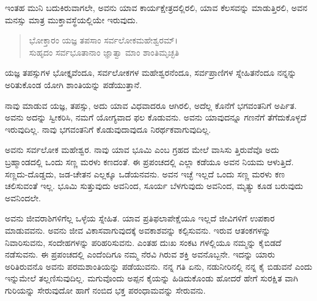 ಇಂತಹ ಮುನಿ ಬದುಕಿರುವಾಗಲೇ, ಅವನು ಯಾವ ಕಾರ್ಯಕ್ಷೇತ್ರದಲ್ಲಿರಲಿ, ಯಾವ ಕೆಲಸವನ್ನು ಮಾಡುತ್ತಿರಲಿ, ಅವನ ಮನಸ್ಸು ಮಾತ್ರ ಮುಕ್ತಾವಸ್ಥೆಯಲ್ಲಿಯೇ ಇರುವುದು.

\begin{verse}
ಭೋಕ್ತಾರಂ ಯಜ್ಞ ತಪಸಾಂ ಸರ್ವಲೋಕಮಹೇಶ್ವರಮ್​।\\ಸುಹೃದಂ ಸರ್ವಭೂತಾನಾಂ ಜ್ಞಾತ್ವಾ ಮಾಂ ಶಾಂತಿಮೃಚ್ಛತಿ 
\end{verse}

{\small ಯಜ್ಞ ತಪಸ್ಸುಗಳ ಭೋಕ್ತೃವೆಂದೂ, ಸರ್ವಲೋಕಗಳ ಮಹೇಶ್ವರನೆಂದೂ, ಸರ್ವಪ್ರಾಣಿಗಳ ಸ್ನೇಹಿತನೆಂದೂ ನನ್ನನ್ನು ಅರಿತುಕೊಂಡ ಯೋಗಿ ಶಾಂತಿಯನ್ನು ಪಡೆಯುತ್ತಾನೆ.}

ನಾವು ಮಾಡುವ ಯಜ್ಞ, ತಪಸ್ಸು, ಅದು ಯಾವ ವಿಧವಾದರೂ ಆಗಿರಲಿ, ಅದೆಲ್ಲ ಕೊನೆಗೆ ಭಗವಂತನಿಗೆ ಅರ್ಪಿತ. ಅವನು ಅದನ್ನು ಸ್ವೀಕರಿಸಿ, ನಮಗೆ ಯೋಗ್ಯವಾದ ಫಲ ಕೊಡುವನು. ಅವನು ಯಾವುದನ್ನೂ ಗಣನೆಗೆ ತೆಗೆದುಕೊಳ್ಳದೆ ಇರುವುದಿಲ್ಲ. ನಾವು ಭಗವಂತನಿಗೆ ಕೊಡುವುದಾವುದೂ ನಿರರ್ಥಕವಾಗುವುದಿಲ್ಲ. 

ಅವನು ಸರ್ವಲೋಕ ಮಹೇಶ್ವರ. ನಾವು ಯಾವ ಭೂಮಿ ಎಂಬ ಗ್ರಹದ ಮೇಲೆ ವಾಸಿಸು ತ್ತಿರುವೆವೊ ಅದು ಬ್ರಹ್ಮಾಂಡದಲ್ಲಿ ಒಂದು ಸಣ್ಣ ಮರಳು ಕಣದಂತೆ. ಈ ಪ್ರಪಂಚದಲ್ಲಿ ಎಲ್ಲಾ ಕಡೆಯೂ ಅವನ ನಿಯಮ ಆಳುತ್ತಿದೆ. ಸಣ್ಣದು-ದೊಡ್ಡದು, ಜಡ-ಚೇತನ ಎಲ್ಲಕ್ಕೂ ಒಡೆಯನವನು. ಅವನ ಇಚ್ಛೆ ಇಲ್ಲದೆ ಒಂದು ಸಣ್ಣ ಮರಳು ಕಣ ಚಲಿಸುವಂತೆ ಇಲ್ಲ. ಭೂಮಿ ಸುತ್ತುವುದು ಅವನಿಂದ, ಸೂರ್ಯ ಬೆಳಗುವುದು ಅವನಿಂದ, ಮೃತ್ಯು ಕೂಡ ಬರುವುದು ಅವನಿಂದಲೇ.

ಅವನು ಜೀವರಾಶಿಗಳಿಗೆಲ್ಲ ಒಳ್ಳೆಯ ಸ್ನೇಹಿತ. ಯಾವ ಪ್ರತಿಫಲಾಪೇಕ್ಷೆಯೂ ಇಲ್ಲದೆ ಜೀವಿಗಳಿಗೆ ಉಪಕಾರ ಮಾಡುವವನು. ಅವನು ಜೀವ ವಿಕಾಸವಾಗುವುದಕ್ಕೆ ಅವಕಾಶವನ್ನು ಕಲ್ಪಿಸುವನು. ಇರುವ ಆತಂಕಗಳನ್ನು ನಿವಾರಿಸುವನು, ಸಂದೇಹಗಳನ್ನು ಪರಿಹರಿಸುವನು. ಎಂತಹ ದುಃಖ ಸಂಕಟ ಗಳಲ್ಲಿಯೂ ನಮ್ಮನ್ನು ಕೈಬಿಡದೆ ನಡೆಸುವನು. ಈ ಪ್ರಪಂಚದಲ್ಲಿ ಎಂದೆಂದಿಗೂ ನಮ್ಮ ನೆರವಿ ಗಿರುವ ಶಕ್ತಿ ಅವನೊಬ್ಬನೇ. ಇದನ್ನು ಯಾರು ಅರಿತಿರುವನೊ ಅವನು ಪರಮಶಾಂತಿಯನ್ನು ಪಡೆಯುವನು. ನನ್ನ ಗತಿ ಏನು, ನಡುನೀರಿನಲ್ಲಿ ನನ್ನ ಕೈ ಬಿಡುವನೆ ಎಂದು ಇನ್ನುಮೇಲೆ ತಲ್ಲಣಿಸುವುದಿಲ್ಲ. ಮಗುವೊಂದು ಅಪ್ಪನ ಕೈಯನ್ನು ಹಿಡಿದುಕೊಂಡು ಹೋದರೆ ಹೇಗೆ ಸುರಕ್ಷಿತ ವಾಗಿ ಗುರಿಯನ್ನು ಸೇರುವುದೋ ಹಾಗೆ ನಂಬಿದ ಭಕ್ತ ಪರಂಧಾಮವನ್ನು ಸೇರುವನು.

